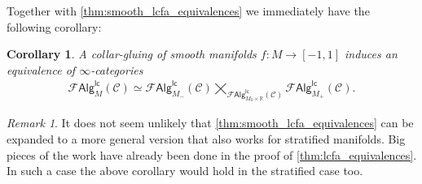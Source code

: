 \documentclass[12pt,a4paper]{article}
\newcounter{counter} \numberwithin{counter}{section}
\theoremstyle{definition}
\theoremstyle{plain}
\newtheorem{corollary}[counter]{Corollary}
\theoremstyle{remark}
\newtheorem{remark}[counter]{Remark}
\newcommand{\catC}{\mathscr{C}}
\newcommand{\lcfa}{\mathscr{F} \mathsf{Alg}^{\mathsf{lc}}}
\begin{document}
Together with \cref{thm:smooth_lcfa_equivalences} we immediately have the following corollary:

\begin{corollary}\label{cor:smooth_gluinglcfas}
    A collar-gluing of smooth manifolds $f: M \rightarrow [-1,1]$ induces an equivalence of $\infty$-categories
    \begin{align}
        \lcfa_M (\catC) \simeq \lcfa_{M_-} (\catC) \bigtimes_{\lcfa_{M_0 \times \mathbb{R}} (\catC)} \lcfa_{M_+}(\catC).
    \end{align}
\end{corollary}

\begin{remark}
    It does not seem unlikely that \cref{thm:smooth_lcfa_equivalences} can be expanded to a more general version that also works for stratified manifolds. Big pieces of the work have already been done in the proof of \cref{thm:lcfa_equivalences}. In such a case the above corollary would hold in the stratified case too.
\end{remark}
\end{document}
